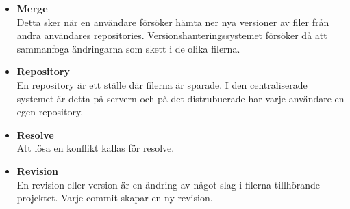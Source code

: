 \begin{itemize}
	\item \textbf{Merge}
	\\Detta sker när en användare försöker hämta ner nya versioner av filer från andra användares repositories. Versionshanteringssystemet försöker då att sammanfoga ändringarna som skett i de olika filerna.
			
	\item \textbf{Repository}
	\\En repository är ett ställe där filerna är sparade. I den centraliserade systemet är detta på servern och på det distrubuerade har varje användare en egen repository.

	\item \textbf{Resolve}
	\\Att lösa en konflikt kallas för resolve.
	
	\item \textbf{Revision}
	\\En revision eller version är en ändring av något slag i filerna tillhörande projektet. Varje commit skapar en ny revision.
\end{itemize}

